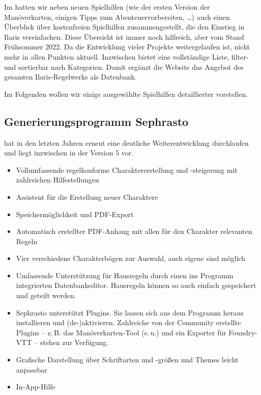 \spaltenanfang
Im 
hatten wir neben neuen Spielhilfen (wie der ersten Version der Manöverkarten, einigen Tipps zum Abenteuervorbereiten, \dots) auch einen Überblick über kostenfreien Spielhilfen zusammengestellt, die den Einstieg in Ilaris vereinfachen.
Diese Übersicht ist immer noch hilfreich, aber vom Stand Früh\-som\-mer 2022.
Da die Entwicklung vieler Projekte weitergelaufen ist, nicht mehr in allen Punkten aktuell.
Inzwischen bietet  eine vollständige Liste, filter- und sortierbar nach Kategorien. Damit ergänzt die Website das Angebot des gesamten Ilaris-Regelwerks als Datenbank.

Im Folgenden wollen wir einige ausgewählte Spielhilfen detaillierter vorstellen.

\subsection*{Generierungsprogramm Sephrasto}
 hat in den letzten Jahren erneut eine deutliche Weiterentwicklung durchlaufen und liegt inzwischen in der Version 5 vor.

\begin{itemize}
\item Vollumfassende regelkonforme Charaktererstellung und -steigerung mit zahlreichen Hilfestellungen
\item 	Assistent für die Erstellung neuer Charaktere
\item	Speichermöglichkeit und PDF-Export
\item	Automatisch erstellter PDF-Anhang mit allen für den Charakter relevanten Regeln
\item	Vier verschiedene Charakterbögen zur Auswahl, auch eigene sind möglich
\item	Umfassende Unterstützung für Hausregeln durch einen ins Programm integrierten Datenbankeditor. Hausregeln können so auch einfach gespeichert und geteilt werden.
\item	Sephrasto unterstützt Plugins. Sie lassen sich aus dem Programm heraus installieren und (de-)aktivieren.
Zahlreiche von der Community erstellte Plugins -- z.\,B. das Manöverkarten-Tool (s.\,u.) und ein Exporter für Foundry-VTT -- stehen zur Verfügung.
\item	Grafische Darstellung über Schriftarten und -größen und Themes leicht anpassbar
\item	In-App-Hilfe
\end{itemize}


